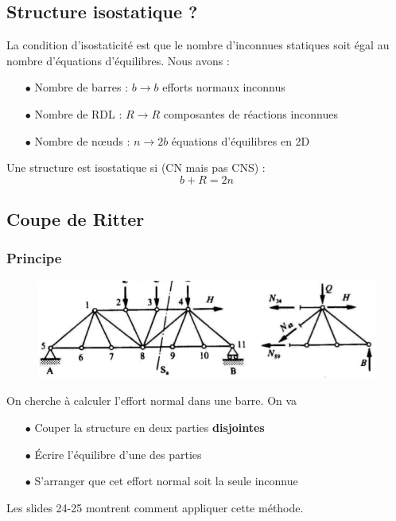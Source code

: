 	\subsection{Structure isostatique ?}
	La condition d'isostaticité est que le nombre d'inconnues statiques soit 
	égal au nombre d'équations d'équilibres. Nous avons :
	\begin{itemize}
	\item[$\bullet$] Nombre de barres : $b \rightarrow b$ efforts normaux 
	inconnus
	\item[$\bullet$] Nombre de RDL : $R \rightarrow R$ composantes de réactions 
	inconnues
	\item[$\bullet$] Nombre de nœuds : $n\rightarrow 2b$ équations d'équilibres 
	en 2D
	\end{itemize}
	Une structure est isostatique si (CN mais pas CNS) :
	\begin{equation}
	b + R = 2n
	\end{equation}
	\newpage
	
	\subsection{Coupe de Ritter}
		\subsubsection{Principe}
	\begin{figure}
	\vspace{-4mm}
	\includegraphics[scale=0.4]{ch3/image5.png}
	\end{figure}
		On cherche à calculer l'effort normal dans une barre. On va
		\begin{itemize}
		\item[$\bullet$] Couper la structure en deux parties \textbf{disjointes}
		\item[$\bullet$] Écrire l'équilibre d'une des parties
		\item[$\bullet$] S'arranger que cet effort normal soit la seule inconnue
		\end{itemize}
		Les slides 24-25 montrent comment appliquer cette méthode.
		
